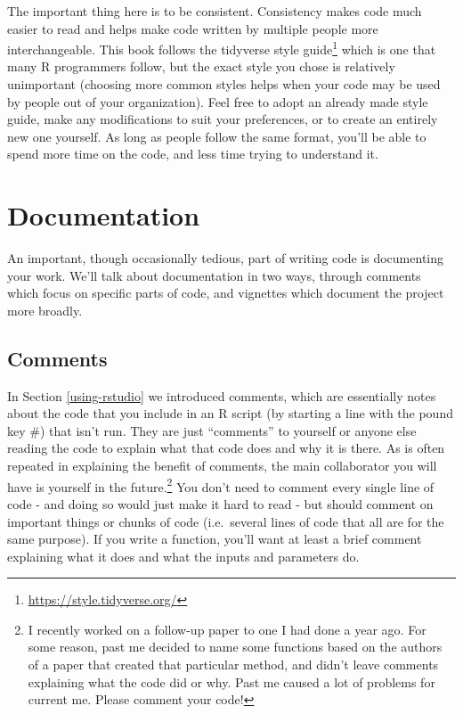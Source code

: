 \documentclass[
]{krantz}
\renewcommand{\href}[2]{#2\footnote{\url{#1}}}
\begin{document}
The important thing here is to be consistent. Consistency
makes code much easier to read and helps make code written
by multiple people more interchangeable. This book follows
the \href{https://style.tidyverse.org/}{tidyverse style
guide} which is one that many R programmers follow, but the
exact style you chose is relatively unimportant (choosing
more common styles helps when your code may be used by
people out of your organization). Feel free to adopt an
already made style guide, make any modifications to suit
your preferences, or to create an entirely new one yourself.
As long as people follow the same format, you'll be able to
spend more time on the code, and less time trying to
understand it.

\hypertarget{documentation}{%
\section{Documentation}\label{documentation}}

An important, though occasionally tedious, part of writing
code is documenting your work. We'll talk about
documentation in two ways, through comments which focus on
specific parts of code, and vignettes which document the
project more broadly.

\hypertarget{comments}{%
\subsection{Comments}\label{comments}}

In Section \ref{using-rstudio} we introduced comments, which
are essentially notes about the code that you include in an
R script (by starting a line with the pound key \#) that
isn't run. They are just ``comments'' to yourself or anyone
else reading the code to explain what that code does and why
it is there. As is often repeated in explaining the benefit
of comments, the main collaborator you will have is yourself
in the future.\footnote{I recently worked on a follow-up
  paper to one I had done a year ago. For some reason, past
  me decided to name some functions based on the authors of
  a paper that created that particular method, and didn't
  leave comments explaining what the code did or why. Past
  me caused a lot of problems for current me. Please comment
  your code!} You don't need to comment every single line of
code - and doing so would just make it hard to read - but
should comment on important things or chunks of code
(i.e.~several lines of code that all are for the same
purpose). If you write a function, you'll want at least a
brief comment explaining what it does and what the inputs
and parameters do.
\end{document}
